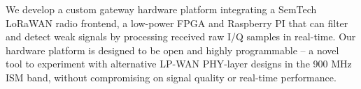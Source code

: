 We develop a custom gateway hardware platform integrating a SemTech LoRaWAN
radio frontend, a low-power FPGA and Raspberry PI that can filter and detect
weak signals by processing received raw I/Q samples in real-time. Our hardware
platform is designed to be open and highly programmable -- a novel tool to
experiment with alternative LP-WAN PHY-layer designs in the 900 MHz ISM band,
without compromising on signal quality or real-time performance. 





